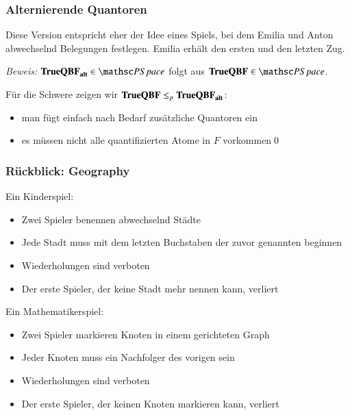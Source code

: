 \documentclass[aspectratio=1610,onlymath]{beamer}
\begin{document}
\begin{frame}\frametitle{Alternierende Quantoren}



Diese Version entspricht eher der Idee eines Spiels, bei dem Emilia und Anton abwechselnd
Belegungen festlegen. Emilia erhält den ersten und den letzten Zug.\bigskip\pause


\pause\emph{Beweis:} $\Slang{TrueQBF}_{\Slang{alt}}\in\PSpace$ folgt aus $\Slang{TrueQBF}\in\PSpace$.\bigskip

Für die Schwere zeigen wir $\textbf{\textcolor{black}{TrueQBF}}\leq_p\textbf{\textcolor{black}{TrueQBF}}_{\textbf{\textcolor{black}{alt}}}$:
\begin{itemize}
\item man fügt einfach nach Bedarf zusätzliche Quantoren ein
\item es müssen nicht alle quantifizierten Atome in $F$ vorkommen\qed
\end{itemize}

\end{frame}

\begin{frame}\frametitle{Rückblick: Geography}

\alert{Ein Kinderspiel:}
\begin{itemize}
\item Zwei Spieler benennen abwechselnd Städte
\item Jede Stadt muss mit dem letzten Buchstaben der zuvor genannten beginnen
\item Wiederholungen sind verboten
\item Der erste Spieler, der keine Stadt mehr nennen kann, verliert
\end{itemize}
\smallskip

\alert{Ein Mathematikerspiel:}
\begin{itemize}
\item Zwei Spieler markieren Knoten in einem gerichteten Graph
\item Jeder Knoten muss ein Nachfolger des vorigen sein
\item Wiederholungen sind verboten
\item Der erste Spieler, der keinen Knoten markieren kann, verliert
\end{itemize}
\smallskip

{}

\end{frame}
\end{document}
